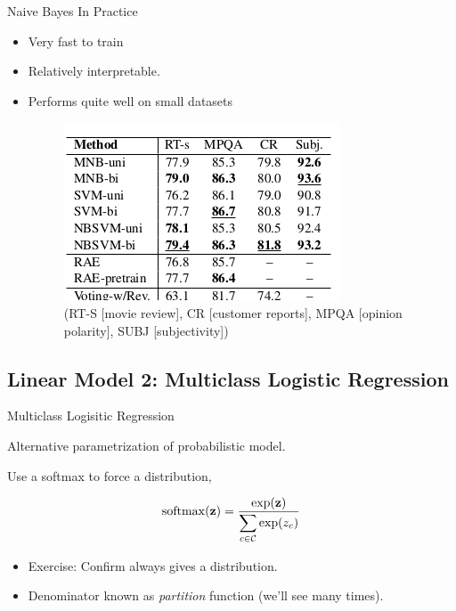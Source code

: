 \documentclass{beamer}
\begin{document}
\begin{frame}{Naive Bayes In Practice}
  \begin{itemize}
  \item Very fast to train
  \item Relatively interpretable.
  \item Performs quite well on small datasets

  \begin{figure}
    \includegraphics{data}
    \caption{  (RT-S [movie review], CR [customer reports], MPQA [opinion polarity], SUBJ [subjectivity])}
  \end{figure}
\end{itemize}

\end{frame}

\subsection{Linear Model 2: Multiclass Logistic Regression}

\begin{frame}{Multiclass Logisitic Regression}

  Alternative parametrization of probabilistic model.

  
  Use a softmax to force a distribution,
  
  \[\softmax(\boldz) = \frac{\exp(\boldz)}{\displaystyle \sum_{c \in \mcC} \exp(z_c)}  \]

  \begin{itemize}
  \item Exercise: Confirm always gives a distribution.

  \item Denominator known as \textit{partition} function (we'll see many times).
  \end{itemize}

\end{frame}
\end{document}
